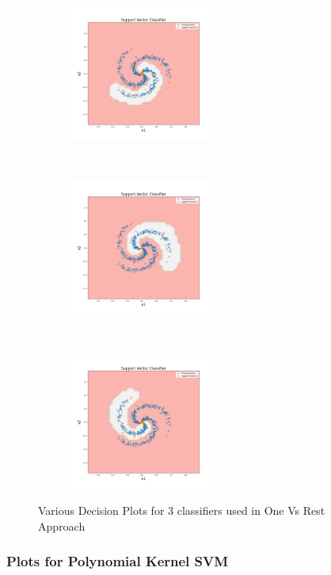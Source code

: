 \begin{figure}[!ht]
    \centering
    \begin{subfigure}[t]{0.3\textwidth}
        \centering
        \includegraphics[height=1.75in]{Dataset_1b/SVM/test1.png}
    \end{subfigure}%
    ~ 
    \begin{subfigure}[t]{0.3\textwidth}
        \centering
        \includegraphics[height=1.75in]{Dataset_1b/SVM/test2.png}
    \end{subfigure}%
    ~
    \begin{subfigure}[t]{0.3\textwidth}
        \centering
        \includegraphics[height=1.75in]{Dataset_1b/SVM/test3.png}
    \end{subfigure}%
    \caption{Various Decision Plots for 3 classifiers used in One Vs Rest Approach}
    \label{fig:13}
\end{figure}



\newpage
\subsubsection{Plots for Polynomial Kernel SVM}

